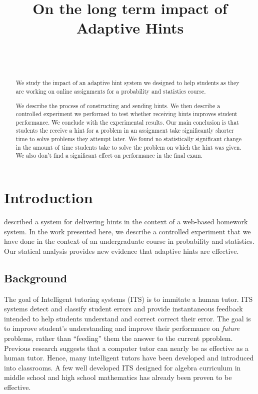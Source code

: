 \documentclass{sigchi/sigchi}
\title{On the long term impact of Adaptive Hints}
\author{
  \alignauthor{Zhen Zhai\\
    \affaddr{UC San Diego}\\
    \email{zzhai@eng.ucsd.edu}}\\
  \alignauthor{Yoav Freund\\
    \affaddr{UC San Diego}\\
    \email{yfreund@eng.ucsd.edu}}\\
}
\begin{document}
\maketitle


\begin{abstract}
We study the impact of an adaptive hint system we designed to help students as they are working on online assignments for a probability and statistics course.

We describe the process of constructing and sending hints. We then describe a controlled experiment we performed to test whether receiving hints improves student performance. We conclude with the experimental results. Our main conclusion is that students the receive a hint for a problem in an assignment take significantly shorter time to solve problems they attempt later. We found no statistically significant change in the amount of time students take to solve the problem on which the hint was given. We also don't find a significant effect on performance in the final exam.

\end{abstract}


\section*{Introduction}

\cite{ElkherjFreund14} described a system for delivering hints in the
context of a web-based homework system. In the work presented here, we
describe a controlled experiment that we have done in the context of
an undergraduate course in probability and statistics. Our statical
analysis provides new evidence that adaptive hints are effective.


\subsection*{Background}
The goal of Intelligent tutoring systems (ITS)\cite{Anderson1995} is
to immitate a human tutor.  ITS systems detect and classify student
errors and provide instantaneous feedback intended to help students
understand and correct correct their error. The goal is to improve
student's understanding and improve their performance on {\em future}
problems, rather than ``feeding'' them the answer to the current
pproblem.  Previous research suggests that a computer tutor can nearly
be as effective as a human tutor\cite{Vanlehn2011}. Hence, many
intelligent tutors have been developed and introduced into
classrooms. A few well developed ITS designed for algebra curriculum
in middle school and high school mathematics has already been proven
to be effective\cite{Koedinger1997,John2014}.
\end{document}
